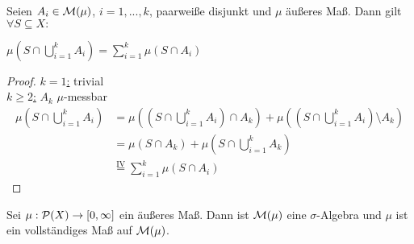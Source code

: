 
  \begin{lemma}
    Seien $A_i \in \mathcal{M}(\mu)$, $i=1,...,k$, paarweiße disjunkt und $\mu$ äußeres Maß. Dann gilt $\forall S \subseteq X:$
    \begin{center}
      $\mu(S \cap \bigcup\limits_{i=1}^k A_i) = \sum\limits_{i=1}^k \mu(S \cap A_i)$
    \end{center}
  \end{lemma}

  \begin{proof}
    \underline{$k=1$:} trivial\\
    \underline{$k \geq 2$:} $A_k$ $\mu$-messbar\\
    \begin{align*}
      \mu(S \cap \bigcup\limits_{i=1}^k A_i) 
      &= \mu((S \cap \bigcup\limits_{i=1}^k A_i) \cap A_k) + \mu((S \cap \bigcup\limits_{i=1}^k A_i) \setminus A_k)\\
      &=\mu(S \cap A_k) + \mu(S \cap \bigcup\limits_{i=1}^k A_k)\\
      &\stackrel{\text{IV}}{=} \sum\limits_{i=1}^k \mu(S \cap A_i) 
    \end{align*}
  \end{proof}

  \begin{theorem}
    Sei $\mu: \mathcal{P}(X) \to [0,\infty]$ ein äußeres Maß. Dann ist $\mathcal{M}(\mu)$ eine $\sigma$-Algebra und $\mu$ ist ein vollständiges Maß auf $\mathcal{M}(\mu)$.
  \end{theorem}

